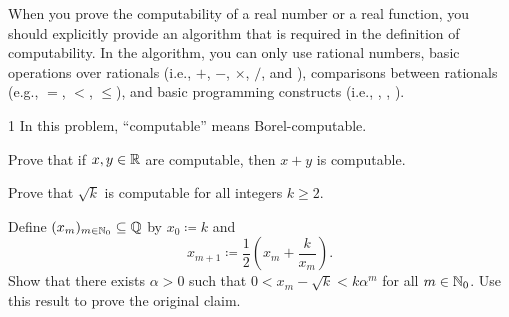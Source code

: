 \documentclass[11pt, oneside]{article}
\begin{document}

When you prove the computability of a real number or a real function, you should
explicitly provide an algorithm that is required in the definition of
computability. In the algorithm, you can only use rational numbers, basic
operations over rationals (i.e., $+$, $-$, $\times$, $/$, and ),
comparisons between rationals (e.g., $=$, $<$, $\le$), and basic programming
constructs (i.e., , , ).

\begin{problem}{1}
In this problem, ``computable'' means Borel-computable.
\begin{problemsubparts}
    \item Prove that if $x, y\in\mathbb{R}$ are computable, then $x+y$ is computable.
    \item Prove that $\sqrt{k}$ is computable for all integers $k\ge2$.

    \begin{hint}
    Define $(x_m)_{m\in\mathbb{N}_0}\subseteq\mathbb{Q}$ by
    $x_0\coloneqq k$ and
    \[
      x_{m+1}\coloneqq\frac12\left(x_m+\frac{k}{x_m}\right).
    \]
    Show that there exists $\alpha>0$ such that
    $0<x_m-\sqrt{k}<k\alpha^m$ for all $m\in\mathbb{N}_0$.
    Use this result to prove the original claim.
    \end{hint}
\end{problemsubparts}
\end{problem}
\end{document}
